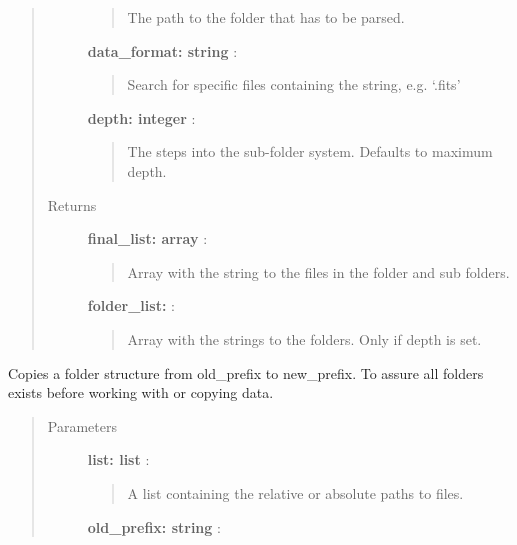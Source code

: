 \documentclass[a4paper,10pt,english]{sphinxmanual}
\begin{document}
\begin{fulllineitems}
\begin{fulllineitems}
\begin{quote}
\begin{description}
\begin{quote}
The path to the folder that has to be parsed.
\end{quote}

\textbf{data\_format: string} :
\begin{quote}

Search for specific files containing the string, e.g.
`.fits'
\end{quote}

\textbf{depth: integer} :
\begin{quote}

The steps into the sub-folder system. Defaults to maximum depth.
\end{quote}

\item[{Returns }] \leavevmode
\textbf{final\_list: array} :
\begin{quote}

Array with the string to the files in the folder and sub folders.
\end{quote}

\textbf{folder\_list:} :
\begin{quote}

Array with the strings to the folders. Only if depth is set.
\end{quote}

\end{description}\end{quote}

\end{fulllineitems}


\begin{fulllineitems}
\label{maps:astrolyze.maps.stack.Stack.copy_structure}
Copies a folder structure from old\_prefix to new\_prefix. To assure all
folders exists before working with or copying data.
\begin{quote}\begin{description}
\item[{Parameters }] \leavevmode
\textbf{list: list} :
\begin{quote}

A list containing the relative or absolute paths to files.
\end{quote}

\textbf{old\_prefix: string} :
\begin{quote}


\end{quote}
\end{description}
\end{quote}
\end{fulllineitems}
\end{fulllineitems}
\end{document}
